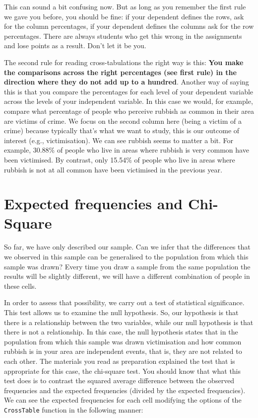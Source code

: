 \documentclass[
]{book}
\begin{document}
This can sound a bit confusing now. But as long as you remember the first rule we gave you before, you should be fine: if your dependent defines the rows, ask for the column percentages, if your dependent defines the columns ask for the row percentages. There are always students who get this wrong in the assignments and lose points as a result. Don't let it be you.

The second rule for reading cross-tabulations the right way is this: \textbf{You make the comparisons across the right percentages (see first rule) in the direction where they do not add up to a hundred}. Another way of saying this is that you compare the percentages for each level of your dependent variable across the levels of your independent variable. In this case we would, for example, compare what percentage of people who perceive rubbish as common in their area are victims of crime. We focus on the second column here (being a victim of a crime) because typically that's what we want to study, this is our outcome of interest (e.g., victimisation). We can see rubbish seems to matter a bit. For example, 30.88\% of people who live in areas where rubbish is very common have been victimised. By contrast, only 15.54\% of people who live in areas where rubbish is not at all common have been victimised in the previous year.

\section{Expected frequencies and Chi-Square}\label{expected-frequencies-and-chi-square}

So far, we have only described our sample. Can we infer that the differences that we observed in this sample can be generalised to the population from which this sample was drawn? Every time you draw a sample from the same population the results will be slightly different, we will have a different combination of people in these cells.

In order to assess that possibility, we carry out a test of statistical significance. This test allows us to examine the null hypothesis. So, our hypothesis is that there is a relationship between the two variables, while our null hypothesis is that there is not a relationship. In this case, the null hypothesis states that in the population from which this sample was drawn victimisation and how common rubbish is in your area are independent events, that is, they are not related to each other. The materials you read as preparation explained the test that is appropriate for this case, the chi-square test. You should know that what this test does is to contrast the squared average difference between the observed frequencies and the expected frequencies (divided by the expected frequencies). We can see the expected frequencies for each cell modifying the options of the \texttt{CrossTable} function in the following manner:
\end{document}
